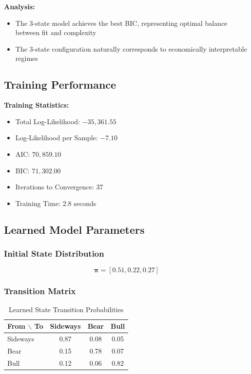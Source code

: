 \documentclass[conference]{IEEEtran}
\begin{document}
\textbf{Analysis:}
\begin{itemize}
\item The 3-state model achieves the best BIC, representing optimal balance between fit and complexity
\item The 3-state configuration naturally corresponds to economically interpretable regimes
\end{itemize}

\subsection{Training Performance}

\textbf{Training Statistics:}
\begin{itemize}
\item Total Log-Likelihood: $-35,361.55$
\item Log-Likelihood per Sample: $-7.10$
\item AIC: $70,859.10$
\item BIC: $71,302.00$
\item Iterations to Convergence: 37
\item Training Time: 2.8 seconds
\end{itemize}

\subsection{Learned Model Parameters}

\subsubsection{Initial State Distribution}
\begin{equation}
\boldsymbol{\pi} = [0.51, 0.22, 0.27]
\end{equation}

\subsubsection{Transition Matrix}
\begin{table}[htbp]
\centering
\caption{Learned State Transition Probabilities}
\label{tab:transitions}
\begin{tabular}{lccc}
\toprule
\textbf{From $\backslash$ To} & \textbf{Sideways} & \textbf{Bear} & \textbf{Bull} \\
\midrule
Sideways & 0.87 & 0.08 & 0.05 \\
Bear & 0.15 & 0.78 & 0.07 \\
Bull & 0.12 & 0.06 & 0.82 \\
\bottomrule
\end{tabular}
\end{table}
\end{document}
